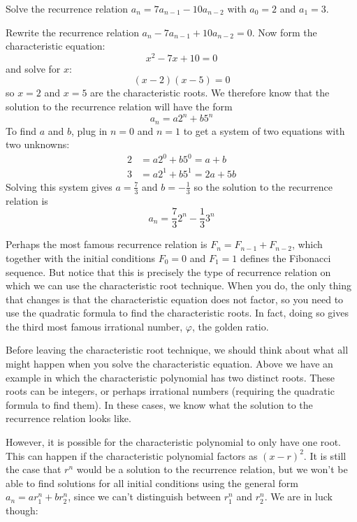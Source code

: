 \documentclass[12pt]{article}
\begin{document}
\begin{example}
  Solve the recurrence relation $a_n = 7a_{n-1} - 10 a_{n-2}$ with $a_0 = 2$ and $a_1 = 3$. 
  \begin{solution}
   Rewrite the recurrence relation $a_n - 7a_{n-1} + 10a_{n-2} = 0$.  Now form the characteristic equation:
   \[x^2 - 7x + 10 = 0\]
   and solve for $x$: 
   \[(x - 2) (x - 5) = 0\]
   so $x = 2$ and $x = 5$ are the characteristic roots.  We therefore know that the solution to the recurrence relation will have the form
   \[a_n = a 2^n + b 5^n\]  
   To find $a$ and $b$, plug in $n =0$ and $n = 1$ to get a system of two equations with two unknowns:
   \begin{align*}
    2 & = a 2^0 + b 5^0 = a + b\\
    3 & = a 2^1 + b 5^1 = 2a + 5b
   \end{align*}
  Solving this system gives $a = \frac{7}{3}$ and $b = -\frac{1}{3}$ so the solution to the recurrence relation is
  \[a_n = \frac{7}{3}2^n - \frac{1}{3} 3^n\]
  \end{solution}

\end{example}

Perhaps the most famous recurrence relation is $F_n = F_{n-1} + F_{n-2}$, which together with the initial conditions $F_0 = 0$ and $F_1= 1$ defines the Fibonacci sequence.  But notice that this is precisely the type of recurrence relation on which we can use the characteristic root technique.  When you do, the only thing that changes is that the characteristic equation does not factor, so you need to use the quadratic formula to find the characteristic roots.  In fact, doing so gives the third most famous irrational number, $\varphi$, the golden ratio.

Before leaving the characteristic root technique, we should think about what all might happen when you solve the characteristic equation.  Above we have an example in which the characteristic polynomial has two distinct roots.  These roots can be integers, or perhaps irrational numbers (requiring the quadratic formula to find them).  In these cases, we know what the solution to the recurrence relation looks like.  

However, it is possible for the characteristic polynomial to only have one root.  This can happen if the characteristic polynomial factors as $(x - r)^2$.  It is still the case that $r^n$ would be a solution to the recurrence relation, but we won't be able to find solutions for all initial conditions using the general form $a_n = ar_1^n + br_2^n$, since we can't distinguish between $r_1^n$ and $r_2^n$.  We are in luck though:
\end{document}
